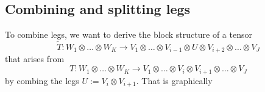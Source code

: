 \clearpage
\subsection{Combining and splitting legs}
\label{subsec:nonabelian:tensors:combine_split}

To combine legs, we want to derive the block structure of a tensor
\begin{equation}
    \tilde{T}: W_1 \otimes\dots\otimes W_K \to V_1 \otimes\dots\otimes V_{i-1} \otimes U \otimes V_{i+2}\otimes \dots \otimes V_J
\end{equation}
that arises from
\begin{equation}
    T: W_1 \otimes\dots\otimes W_K \to V_1 \otimes\dots\otimes V_{i} \otimes V_{i+1} \otimes\dots\otimes V_J
\end{equation}
by combing the legs $U := V_i \otimes V_{i+1}$.
%
That is graphically
